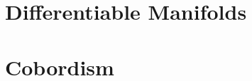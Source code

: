 \documentclass[../../../deep-dive]{subfiles}
\begin{document}
\chapter{Differentiable Manifolds}






% 

\chapter{Cobordism}


\end{document}
